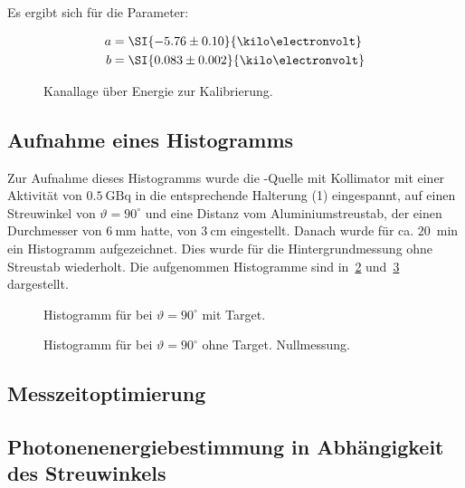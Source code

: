 \documentclass[draft, slug=CS, room=Andreas-Schubert-Bau\,\ Labor\ 406,
supervisor=Juliane\ Volkmer, coursedate=29.\ 11.\ 2019]{../../Lab_Report_LaTeX/lab_report}
\newcommand{\am}{\ce{^241Am}}
\begin{document}
Es ergibt sich f\"ur die Parameter:

\begin{align}
  a &= \SI{-5.76\pm 0.10}{\kilo\electronvolt} \\
  b &= \SI{0.083\pm 0.002}{\kilo\electronvolt} \\
\end{align}


\begin{figure}[h]\centering
  
  \caption{Kanallage \"uber Energie zur Kalibrierung.}
  \label{fig:energyfit}
\end{figure}

\subsection{Aufnahme eines Histogramms}
\label{sec:histogramm}

Zur Aufnahme dieses Histogramms wurde die \am{}-Quelle mit Kollimator mit einer
Aktivität von \(\SI{0,5}{\giga\becquerel}\) in die entsprechende Halterung (1) eingespannt, auf
einen Streuwinkel von \(\vartheta = 90^\circ\) und eine Distanz vom Aluminiumstreustab, der einen
Durchmesser von \(\SI{6}{\milli\metre}\) hatte, von \(\SI{3}{\centi\metre}\) eingestellt.
Danach wurde für ca. \(\SI{20}{\min}\) ein Histogramm aufgezeichnet. Dies wurde für die
Hintergrundmessung ohne Streustab wiederholt. Die aufgenommen
Histogramme sind in~\ref{fig:am20hist} und~\ref{fig:am20histnull} dargestellt.

\begin{figure}[h]\centering
  
  \caption{Histogramm f\"ur \am{} bei \(\vartheta = 90^\circ\) mit Target.}
  \label{fig:am20hist}
\end{figure}
\begin{figure}[h]\centering
  
  \caption{Histogramm f\"ur \am{} bei \(\vartheta = 90^\circ\) ohne
    Target. Nullmessung.}
  \label{fig:am20histnull}
\end{figure}


\subsection{Messzeitoptimierung}
\label{sec:topt}

\subsection{Photonenenergiebestimmung in Abhängigkeit des Streuwinkels}
\label{sec:energwinkel}
\end{document}
